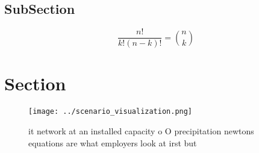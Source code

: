 \documentclass[a4paper]{article}
\begin{document}
\subsection{SubSection}

\[ \frac{n!}{k!(n-k)!} = \binom{n}{k} \]

\section{Section}

\begin{figure}
\centering
\texttt{[image: ../scenario\_visualization.png]}
\caption{ it network at an installed capacity o O precipitation newtons equations are what employers look at irst but 
}
\end{figure}
 
\end{document}
